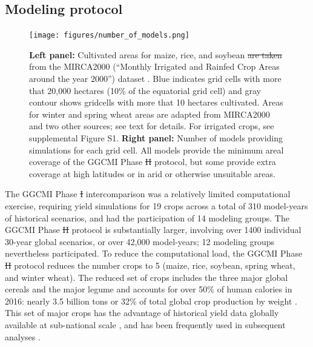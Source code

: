 \documentclass[gmd, manuscript]{copernicus} %
\providecommand{\DIFadd}[1]{{\protect\color{blue}\uwave{#1}}} %
\providecommand{\DIFdel}[1]{{\protect\color{red}\sout{#1}}}                      %
\providecommand{\DIFaddbegin}{} %
\providecommand{\DIFaddend}{} %
\providecommand{\DIFdelbegin}{} %
\providecommand{\DIFdelend}{} %
\providecommand{\DIFaddFL}[1]{\DIFadd{#1}} %
\providecommand{\DIFdelFL}[1]{\DIFdel{#1}} %
\providecommand{\DIFaddbeginFL}{} %
\providecommand{\DIFaddendFL}{} %
\providecommand{\DIFdelbeginFL}{} %
\providecommand{\DIFdelendFL}{} %
\begin{document}
\subsection{Modeling protocol}
\begin{figure}[ht]
  \centering
  \texttt{[image: figures/number\_of\_models.png]}
  \caption{
  \textbf{Left panel:} Cultivated areas for maize, rice, and soybean \DIFdelbeginFL \DIFdelFL{are taken }\DIFdelendFL from the MIRCA2000 (``Monthly Irrigated and Rainfed Crop Areas around the year 2000'') dataset \citep{Portmann2010}. Blue indicates grid cells with more that 20,000 hectares (10\% of the equatorial grid cell) and gray contour shows gridcells with more that 10 hectares cultivated. 
  Areas for winter and spring wheat areas are adapted from MIRCA2000 and two other sources; see text for details.  For irrigated crops, see supplemental Figure S1.
  \textbf{Right panel:} Number of models providing simulations for each grid cell.  
  All models provide the minimum areal coverage of the GGCMI Phase \DIFdelbeginFL \DIFdelFL{II }\DIFdelendFL \DIFaddbeginFL \DIFaddFL{2 }\DIFaddendFL protocol, but some provide extra coverage at high latitudes or in arid or otherwise unsuitable areas.}
  \label{fig:crop_area}
\end{figure}

The GGCMI Phase \DIFdelbegin \DIFdel{I }\DIFdelend \DIFaddbegin \DIFadd{1 }\DIFaddend intercomparison was a relatively limited computational exercise, requiring yield simulations for 19 crops across a total of 310 model-years of historical scenarios, and had the participation of 14 modeling groups.
The GGCMI Phase \DIFdelbegin \DIFdel{II }\DIFdelend \DIFaddbegin \DIFadd{2 }\DIFaddend protocol is substantially larger, involving over 1400 individual 30-year global scenarios, or over 42,000 model-years; 12 modeling groups nevertheless participated. To reduce the computational load, the GGCMI Phase \DIFdelbegin \DIFdel{II }\DIFdelend \DIFaddbegin \DIFadd{2 }\DIFaddend protocol reduces the number crops to 5 (maize, rice, soybean, spring wheat, and winter wheat). 
The reduced set of crops includes the three major global cereals and the major legume and accounts for over 50\% of human calories in 2016: nearly 3.5 billion tons or 32\% of total global crop production by weight \citep{FAOSTAT}. 
This set of major crops has the advantage of historical yield data globally available at sub-national scale \citep{Ray2012,iizumi_historical_2014}, and has been frequently used in subsequent analyses \citep[e.g.][]{muller_global_2017,porwollik_spatial_2016}.
\end{document}
